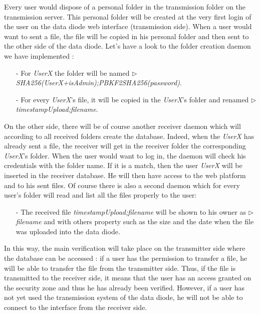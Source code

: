\documentclass[a4paper,10pt]{article}
\begin{document}
Every user would dispose of a personal folder in the transmission folder on the transmission server. This personal folder will be created at the very first login of the user on the data diode web interface (transmission side). When a user would want to sent a file, the file will be copied in his personal folder and then sent to the other side of the data diode. Let's have a look to the folder creation daemon we have implemented :
\begin{enumerate}
\item[-]For \emph{UserX} the folder will be named $\triangleright$ \emph{SHA256(UserX+isAdmin);PBKF2SHA256(password)}.
\item[-]For every \emph{UserX}'s file, it will be copied in the \emph{UserX}'s folder and renamed $\triangleright$ \emph{timestampUpload;filename}.
\end{enumerate}
 
On the other side, there will be of course another receiver daemon which will according to all received folders create the database. Indeed, when the \emph{UserX} has already sent a file, the receiver will get in the receiver folder the corresponding \emph{UserX}'s folder. When the user would want to log in, the daemon will check his credentials with the folder name. If it is a match, then the user \emph{UserX} will be inserted in the receiver database. He will then have access to the web platform and to his sent files. Of course there is also a second daemon which for every user's folder will read and list all the files properly to the user:

\begin{enumerate}

\item[-] The received file \emph{timestampUpload;filename} will be shown to his owner as $\triangleright$ \emph{filename} and with others property such as the size and the date when the file was uploaded into the data diode.
\end{enumerate}

In this way, the main verification will take place on the transmitter side where the database can be accessed : if a user has the permission to transfer a file, he will be able to transfer the file from the transmitter side. Thus, if the file is transmitted to the receiver side, it means that the user has an access granted on the security zone and thus he has already been verified. However, if a user has not yet used the transmission system of the data diode, he will not be able to connect to the interface from the receiver side. 
\end{document}
